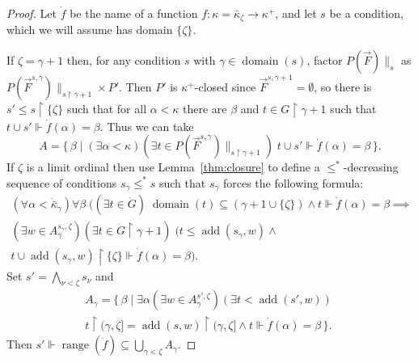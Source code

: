 \documentclass[
twoside,
]{article}
\theoremstyle{definition}
\theoremstyle{remark}
\newcommand{\below}[2]{#1{\|_{#2}}}
\newcommand{\forceKappa}{\bar\kappa} %
\DeclareMathOperator{\add}{add}
\newcommand{\forces}{\Vdash}
\newcommand{\sing}[1]{\{#1\}}
\newcommand{\set}[1]{\{\,#1\,\}}
\newcommand{\restrict}{{\upharpoonright}}
\DeclareMathOperator{\range}{range}
\DeclareMathOperator{\domain}{domain}
\begin{document}
\begin{proof}
    Let $\dot f$ be the name of a function
  $f\colon \kappa=\forceKappa_{\zeta}\to\kappa^{+}$, and let $s$ be a
  condition, which  we will assume has domain $\sing{\zeta}$.   

  If $\zeta=\gamma+1$ then, for any condition $s$ with
  $\gamma\in\domain(s)$, factor $\below{P(\vec F)}{s}$ as
  $\below{P(\vec F^{s,\gamma})}{s\restrict\gamma+1}\times P'$.   Then
  $P'$ is $\kappa^{+}$-closed since $\vec F^{s,\gamma+1}=\emptyset$,
  so there is $s'\leq 
  s\restrict\sing{\zeta}$ such that for all $\alpha<\kappa$ there are
  $\beta$ and $t\in G\restrict\gamma+1$ such that $t\cup s'\forces
  \dot f(\alpha)=\beta$.  Thus we can take
  \begin{equation*}
    A=\set{\beta\mid (\exists\alpha<\kappa)(\exists
      t\in \below{P(\vec F^{s,\gamma})}{s\restrict\gamma+1})\;
      t\cup s'\forces \dot f(\alpha)=\beta}.
\end{equation*}
  If $\zeta$ is a limit ordinal then use
  Lemma~\ref{thm:closure} to define a $\leq^*$-decreasing
  sequence of conditions $s_\gamma\leq^* s$ such that $s_{\gamma}$ forces
  the following formula:
  \begin{multline*}
    (\forall\alpha<\dot{\forceKappa}_{\gamma})\forall\beta\;
    \bigl((\exists t\in \dot 
    G)\;\domain(t)\subseteq(\gamma+1\cup\sing\zeta)\land
    t\forces\dot f(\alpha)=\beta
    \implies
    \\
    (\exists w\in A^{s_{\gamma},\zeta}_{\gamma})(\exists t\in \dot
    G\restrict\gamma+1)\;
    (t\leq\add(s_{\gamma},w)\land
    \\
    t\cup\add(s_{\gamma},w)\restrict\sing{\zeta}\forces\dot f(\alpha)=\beta 
    \bigr).
  \end{multline*}
  Set $s'=\bigwedge_{\nu<\zeta} s_{\nu}$ and 
  \begin{multline*}
    A_{\gamma}=\set{\beta\mid \exists\alpha(\exists w\in
    A^{s',\zeta}_{\gamma})(\exists
    t<\add(s',w))\;\\t\restrict(\gamma,\zeta]=\add(s,w)\restrict(\gamma,\zeta]\land
    t\forces \dot f(\alpha)=\beta}.
  \end{multline*}
  Then $s'\forces\range(\dot f)\subseteq \bigcup_{\gamma<\zeta}A_{\gamma}$.
\end{proof}
\end{document}
